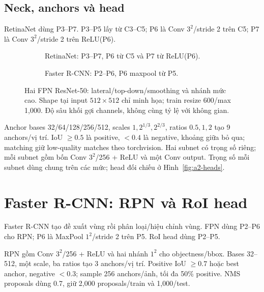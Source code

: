 \subsection{Neck, anchors và head}
RetinaNet dùng P3--P7. P3--P5 lấy từ C3--C5; P6 là Conv $3^2$/stride 2
trên C5; P7 là Conv $3^2$/stride 2 trên ReLU(P6).
\begin{figure}[p]\centering
\begin{subfigure}{\linewidth}\centering
{}
\caption{RetinaNet: P3--P7, P6 từ C5 và P7 từ ReLU(P6).}\label{fig:a2-fpn:a}
\end{subfigure}\par\smallskip
\begin{subfigure}{\linewidth}\centering
{}
\caption{Faster R-CNN: P2--P6, P6 maxpool từ P5.}\label{fig:a2-fpn:b}
\end{subfigure}
\caption{Hai FPN ResNet-50: lateral/top-down/smoothing và nhánh mức cao. Shape tại input $512\times512$ chỉ minh họa; train resize 600/max 1,000. Độ sâu khối gợi channels, không cùng tỷ lệ với không gian.}\label{fig:a2-fpn}
\end{figure}


Anchor bases 32/64/128/256/512, scales $1,2^{1/3},2^{2/3}$, ratios
$0.5, 1, 2$ tạo 9 anchors/vị trí. IoU $\geq 0.5$ là positive, $<0.4$ là
negative, khoảng giữa bỏ qua; matching giữ low-quality matches theo torchvision.
Hai subnet có trọng số riêng; mỗi subnet gồm bốn Conv $3^2$/256 + ReLU
và một Conv output. Trọng số mỗi subnet dùng chung trên các mức;
head đối chiếu ở Hình~\ref{fig:a2-heads}.


\section{Faster R-CNN: RPN và RoI head}
Faster R-CNN \cite{faster} tạo đề xuất vùng rồi phân loại/hiệu chỉnh vùng.
FPN dùng P2--P6 cho RPN; P6 là MaxPool $1^2$/stride 2 trên P5.
RoI head dùng P2--P5.

RPN gồm Conv $3^2$/256 + ReLU và hai nhánh $1^2$ cho objectness/bbox.
Bases 32--512, một scale, ba ratios tạo 3 anchors/vị trí.
Positive IoU $\geq 0.7$ hoặc best anchor, negative $<0.3$; sample
256 anchors/ảnh, tối đa 50\% positive. NMS proposals dùng 0.7,
giữ 2,000 proposals/train và 1,000/test.

